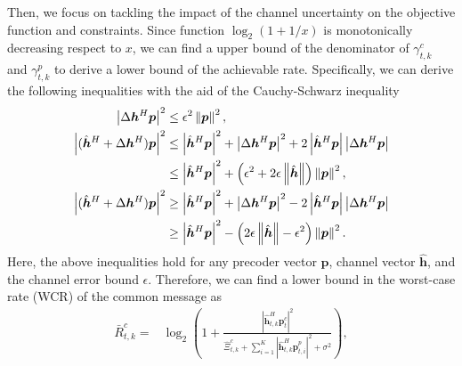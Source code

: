 \documentclass[twocolumn,journal]{IEEEtran}
\begin{document}
Then, we focus on tackling the impact of the channel uncertainty on the objective function and constraints. 
Since function \(\log_2(1+1/x)\) is monotonically decreasing respect to \(x\), we can find a upper bound of the denominator of \(\gamma^{c}_{t,k}\) and \(\gamma^{p}_{t,k}\) to derive a lower bound of the achievable rate. Specifically, we can derive the following inequalities with the aid of the Cauchy-Schwarz inequality \cite{xuResource2025}
\begin{subequations}
\begin{align}
 \left| \Delta\boldsymbol{h}^{H}\boldsymbol{p}\right|^2 &\leq \epsilon^2\left\Vert \boldsymbol{p} \right\Vert^2,\\
 \left| (\hat{\boldsymbol{h}}^{H} + \Delta\boldsymbol{h}^{H})\boldsymbol{p}\right|^2 &\leq \left| \hat{\boldsymbol{h}}^{H}\boldsymbol{p}\right|^2+\left| \Delta\boldsymbol{h}^{H}\boldsymbol{p}\right|^2 + 2\left|\hat{\boldsymbol{h}}^{H}\boldsymbol{p}\right|\left|\Delta\boldsymbol{h}^{H}\boldsymbol{p}\right| \notag\\
    &\leq \left| \hat{\boldsymbol{h}}^{H}\boldsymbol{p}\right|^2 + \left(\epsilon^2+2\epsilon\left\Vert \hat{\boldsymbol{h}} \right\Vert \right)\left\Vert \boldsymbol{p} \right\Vert^2,\\
 \left| (\hat{\boldsymbol{h}}^{H} + \Delta\boldsymbol{h}^{H})\boldsymbol{p}\right|^2 &\geq \left| \hat{\boldsymbol{h}}^{H}\boldsymbol{p}\right|^2+\left| \Delta\boldsymbol{h}^{H}\boldsymbol{p}\right|^2 - 2\left|\hat{\boldsymbol{h}}^{H}\boldsymbol{p}\right|\left|\Delta\boldsymbol{h}^{H}\boldsymbol{p}\right|\notag\\
    &\geq \left| \hat{\boldsymbol{h}}^{H}\boldsymbol{p}\right|^2 - \left(2\epsilon\left\Vert \hat{\boldsymbol{h}} \right\Vert - \epsilon^2 \right)\left\Vert \boldsymbol{p} \right\Vert^2.
\end{align}
\end{subequations}
Here, the above inequalities hold for any precoder vector \(\boldsymbol{p}\), channel vector \(\hat{\boldsymbol{h}}\), and the channel error bound \(\epsilon\).
Therefore, we can find a lower bound in the worst-case rate (WCR) of the common message as
\begin{align}
 \bar{R}^{c}_{t,k} =& \log_2\left(1 + \frac{\left| \hat{\boldsymbol{h}}^{H}_{t,k}\boldsymbol{p}^{c}_{t} \right|^2}{\hat{\Xi}^{c}_{t,k} +  \sum_{i=1}^{K}\left| \hat{\boldsymbol{h}}^{H}_{t,k}\boldsymbol{p}^{p}_{t,i}\right|^2 + \sigma^2}\right), \label{eq:lowerBoundRc}
\end{align}
\end{document}
